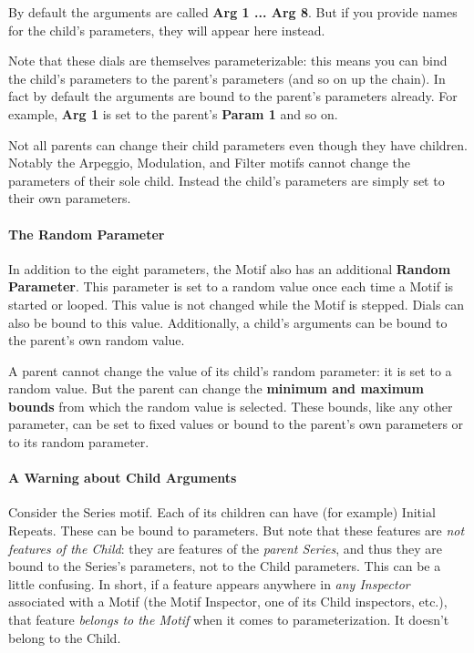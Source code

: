 \documentclass[twoside,10pt]{article}
\begin{document}
By default the arguments are called {\bf Arg 1 ... Arg 8}.  But if you provide names for the child's parameters, they will appear here instead.  

Note that these dials are themselves parameterizable: this means you can bind the child's parameters to the parent's parameters (and so on up the chain).  In fact by default the arguments are bound to the parent's parameters already.  For example, {\bf Arg 1} is set to the parent's {\bf Param 1} and so on.

Not all parents can change their child parameters even though they have children.  Notably the Arpeggio, Modulation, and Filter motifs cannot change the parameters of their sole child.  Instead the child's parameters are simply set to their own parameters.  

\paragraph{The Random Parameter} In addition to the eight parameters, the Motif also has an additional {\bf Random Parameter}.  This parameter is set to a random value once each time a Motif is started or looped.  This value is not changed while the Motif is stepped.  Dials can also be bound to this value.  Additionally, a child's arguments can be bound to the parent's own random value.

A parent cannot change the value of its child's random parameter: it is set to a random value.  But the parent can change the {\bf minimum and maximum bounds} from which the random value is selected.  These bounds, like any other parameter, can be set to fixed values or bound to the parent's own parameters or to its random parameter.

\paragraph{A Warning about Child Arguments}

Consider the Series motif. Each of its children can have (for example) Initial Repeats.  These can be bound to parameters.  But note that these features are {\it not features of the Child}: they are features of the {\it parent Series}, and thus they are bound to the Series's parameters, not to the Child parameters.  This can be a little confusing.  In short, if a feature appears anywhere in {\it any Inspector} associated with a Motif (the Motif Inspector, one of its Child inspectors, etc.), that feature {\it belongs to the Motif} when it comes to parameterization.  It doesn't belong to the Child.
\end{document}

